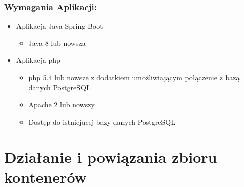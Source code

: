 \documentclass[polish, a4paper, 12pt, oneside]{book}
\begin{document}
\subsubsection{Wymagania Aplikacji:}
\begin{itemize}[noitemsep]
    \item Aplikacja Java Spring Boot
    \begin{itemize}[noitemsep]
    	\item Java 8 lub nowsza
    \end{itemize}
    \item Aplikacja php
	\begin{itemize}[noitemsep]
		\item php 5.4 lub nowsze z dodatkiem umożliwiającym połączenie z bazą danych PostgreSQL
		\item Apache 2 lub nowszy
		\item Dostęp do istniejącej bazy danych PostgreSQL
	\end{itemize}
\end{itemize}

\section{Działanie i powiązania zbioru kontenerów}
\end{document}
